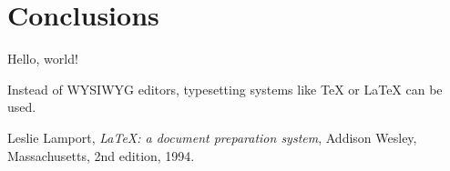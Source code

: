 \documentclass{article}
\begin{document}
\section{Conclusions}

    Hello, world!

    Instead of WYSIWYG editors, typesetting systems like \TeX{} or \LaTeX{} \cite{lamport94} can be used.


\begin{thebibliography}{9}

  Leslie Lamport,
    \textit{\LaTeX: a document preparation system},
    Addison Wesley, Massachusetts,
    2nd edition,
    1994.

\end{thebibliography}
\end{document}
